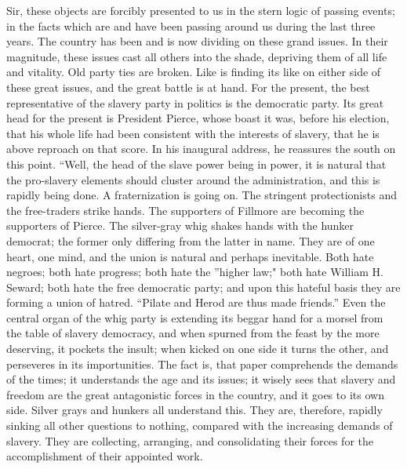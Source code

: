 Sir, these objects are forcibly presented to us in the stern logic of
passing events; in the facts which are and have been passing around us
during the last three years. The country has been and is now dividing on
these grand issues. In their magnitude, these issues cast all others
into the shade, depriving them of all life and vitality. Old party ties
are broken. Like is finding its like on
{\protect\hypertarget{452}{}{}}either side of these great issues, and
the great battle is at hand. For the present, the best representative of
the slavery party in politics is the democratic party. Its great head
for the present is President Pierce, whose boast it was, before his
election, that his whole life had been consistent with the interests of
slavery, that he is above reproach on that score. In his inaugural
address, he reassures the south on this point. ``Well, the head of the
slave power being in power, it is natural that the pro-slavery elements
should cluster around the administration, and this is rapidly being
done. A fraternization is going on. The stringent protectionists and the
free-traders strike hands. The supporters of Fillmore are becoming the
supporters of Pierce. The silver-gray whig shakes hands with the hunker
democrat; the former only differing from the latter in name. They are of
one heart, one mind, and the union is natural and perhaps inevitable.
Both hate negroes; both hate progress; both hate the ''higher law;" both
hate William H. Seward; both hate the free democratic party; and upon
this hateful basis they are forming a union of hatred. ``Pilate and
Herod are thus made friends.'' Even the central organ of the whig party
is extending its beggar hand for a morsel from the table of slavery
democracy, and when spurned from the feast by the more deserving, it
pockets the insult; when kicked on one side it turns the other, and
perseveres in its importunities. The fact is, that paper comprehends the
demands of the times; it understands the age and its issues; it wisely
sees that slavery and freedom are the great antagonistic forces in the
country, and it goes to its own side. Silver grays and hunkers all
understand this. They are, therefore, rapidly sinking all other
questions to nothing, compared with the increasing demands of slavery.
They are collecting, arranging, and consolidating their forces for the
accomplishment of their appointed work.

